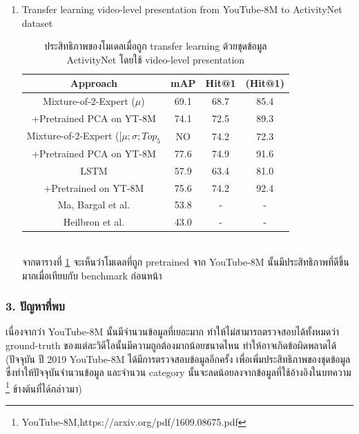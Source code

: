 \begin{enumerate}
\begin{enumerate}
		\item Transfer learning video-level presentation from YouTube-8M to ActivityNet dataset
\begin{table}[!ht]
\centering
\begin{tabular}{|c|c|c|c|}
		\hline
		{Approach}&{mAP}&{Hit@1}&{(Hit@1)}\\
		\hline
		Mixture-of-2-Expert ($\mu$)					& 69.1		& 68.7		& 85.4					\\
		+Pretrained PCA on YT-8M						& 74.1		& 72.5		& 89.3					\\
		Mixture-of-2-Expert ([$\mu ; \sigma ; Top_{5}$		& NO			& 74.2		& 72.3					\\
		+Pretrained PCA on YT-8M						& 77.6		& 74.9		& 91.6					\\
		LSTM									& 57.9		& 63.4		& 81.0					\\
		+Pretrained on YT-8M							& 75.6		& 74.2		& 92.4					\\
		\hline
		Ma, Bargal et al.								& 53.8		& -			& -						\\
		Heilbron et al.								& 43.0		& -			& -						\\
		\hline
	\end{tabular}
	\caption{ประสิทธิภาพของโมเดลเมื่อถูก transfer learning ด้วยชุดข้อมูล ActivityNet โดยใช้ video-level presentation}
	\label{tab: transfer learning ActivityNet}
\end{table}
\\
		จากตารางที่ \ref{tab: transfer learning ActivityNet} จะเห็นว่าโมเดลที่ถูก pretrained จาก YouTube-8M นั้นมีประสิทธิภาพที่ดีขึ้นมากเมื่อเทียบกับ benchmark ก่อนหน้า
	\end{enumerate}
\end{enumerate}

\subsubsection*{3. ปัญหาที่พบ}
เนื่องจากว่า YouTube-8M นั้นมีจำนวนข้อมูลที่เยอะมาก ทำให้ไม่สามารถตรวจสอบได้ทั้งหมดว่า ground-truth ของแต่ละวิดีโอนั้นมีความถูกต้องมากน้อยขนาดไหน ทำให้อาจเกิดข้อผิดพลาดได้ (ปัจจุบัน ปี 2019 YouTube-8M ได้มีการตรวจสอบข้อมูลอีกครั้ง เพื่อเพิ่มประสิทธิภาพของชุดข้อมูลซึ่งทำให้ปัจจุบันจำนวนข้อมูล และจำนวน category นั้นจะลดน้อยลงจากข้อมูลที่ใช้อ้างอิงในบทความ \footnote{YouTube-8M,https://arxiv.org/pdf/1609.08675.pdf} ข้างต้นที่ได้กล่าวมา)






